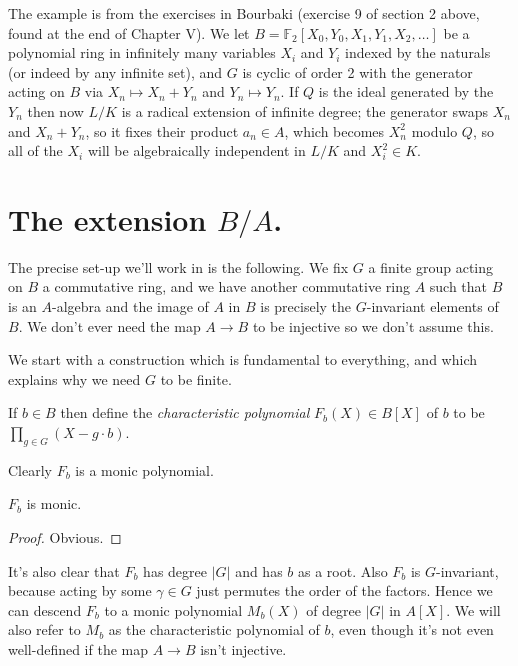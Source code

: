 The example is from the exercises in Bourbaki (exercise 9 of section 2 above, found at the end
of Chapter V). We let $B=\mathbb{F}_2[X_0,Y_0,X_1,Y_1,X_2,\ldots]$
be a polynomial ring in infinitely many variables $X_i$ and $Y_i$ indexed by the
naturals (or indeed by any infinite set), and $G$ is cyclic of order 2 with
the generator acting on $B$ via $X_n\mapsto X_n+Y_n$ and $Y_n\mapsto Y_n$.
If $Q$ is the ideal generated by the $Y_n$ then now $L/K$ is a radical extension of
infinite degree; the generator swaps $X_n$ and $X_n+Y_n$, so it fixes
their product $a_n\in A$, which becomes $X_n^2$ modulo $Q$, so all
of the $X_{i}$ will be algebraically independent in $L/K$ and $X_{i}^2\in K$.

\section{The extension \texorpdfstring{$B/A$}{B/A}.}

The precise set-up we'll work in is the following. We fix $G$ a finite group acting
on $B$ a commutative ring, and we have another commutative ring $A$ such
that $B$ is an $A$-algebra and the image of $A$ in $B$ is precisely the $G$-invariant
elements of $B$. We don't ever need the map $A\to B$ to be injective so we don't assume this.

We start with a construction which is fundamental to everything,
and which explains why we need $G$ to be finite.

\begin{definition}
  \label{MulSemiringAction.charpoly}
  \mathlibok
  If $b\in B$ then define the \emph{characteristic polynomial}
  $F_b(X) \in B[X]$ of $b$ to be $\prod_{g\in G}(X-g\cdot b)$.
\end{definition}

Clearly $F_b$ is a monic polynomial.

\begin{lemma}
  \label{MulSemiringAction.monic_charpoly}
  \mathlibok
  $F_b$ is monic.
\end{lemma}
\begin{proof}
  \mathlibok
  Obvious.
\end{proof}

It's also clear that $F_b$ has degree $|G|$ and has $b$ as a root.
Also $F_b$ is $G$-invariant, because acting by some $\gamma\in G$
just permutes the order of the factors. Hence we can descend $F_b$
to a monic polynomial $M_b(X)$ of degree $|G|$ in $A[X]$. We will
also refer to $M_b$ as the characteristic polynomial of $b$, even though
it's not even well-defined if the map $A\to B$ isn't injective.

